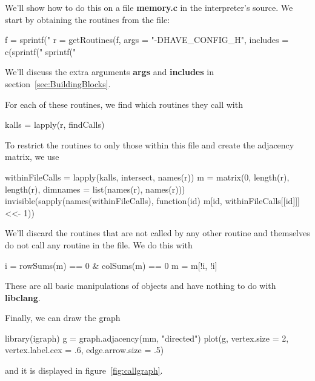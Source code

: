 \documentclass[article]{jss}
\def\R{\proglang{R}}
\def\file#1{\textbf{#1}}
\def\Rarg#1{\textbf{#1}}
\def\libclang{\textbf{libclang}}
\begin{document}
We'll show how to do this on a file \file{memory.c} in the \R{}
interpreter's source.
We start by obtaining the routines from the file:
\begin{RCode}
f = sprintf("%
r = getRoutines(f, args = "-DHAVE_CONFIG_H",
                  includes = c(sprintf("%
                               sprintf("%
\end{RCode}
We'll discuss the extra arguments \Rarg{args} and \Rarg{includes} in section~\ref{sec:BuildingBlocks}.

For each of these routines, we find which routines they call with
\begin{RCode}
kalls = lapply(r, findCalls)
\end{RCode}
To restrict the routines to only those within this file
and create the adjacency matrix, we use 
\begin{RCode}
withinFileCalls = lapply(kalls, intersect, names(r))    
m = matrix(0, length(r), length(r), dimnames = list(names(r), names(r)))
invisible(sapply(names(withinFileCalls), 
           function(id) 
              m[id,  withinFileCalls[[id]]] <<- 1))
\end{RCode}
We'll discard the routines that are not called by any other routine
and themselves do not call any routine in the file. We do this with
\begin{RCode}
i = rowSums(m) == 0 & colSums(m) == 0
m = m[!i, !i]  
\end{RCode}
These are all basic \R{} manipulations of \R{} objects and have
nothing to do with \libclang.

Finally, we can draw the graph
\begin{RCode}
library(igraph)
g = graph.adjacency(mm, "directed")       
plot(g, vertex.size = 2, vertex.label.cex = .6, edge.arrow.size = .5)
\end{RCode}
and it is displayed in figure~\ref{fig:callgraph}.
\end{document}
